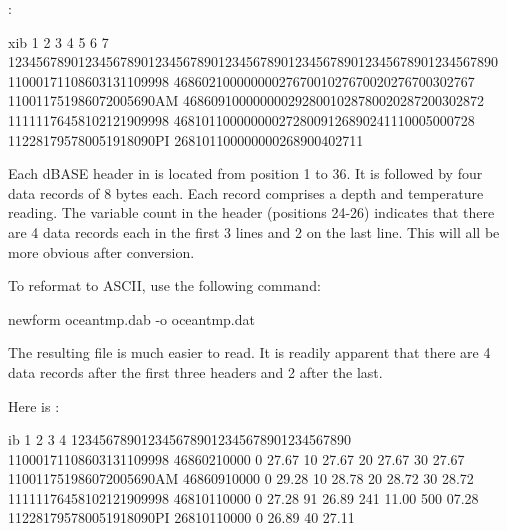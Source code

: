 :

\begin{vcode}{xib}
         1         2         3         4         5         6         7
1234567890123456789012345678901234567890123456789012345678901234567890
11000171108603131109998  4686021000000002767001027670020276700302767
110011751986072005690AM  4686091000000002928001028780020287200302872
11111176458102121909998  4681011000000002728009126890241110005000728
112281795780051918090PI  268101100000000268900402711 
\end{vcode}

Each dBASE header in  is located from position 1 to
36. It is followed by four data records of 8 bytes each. Each record
comprises a depth and temperature reading. The variable count in the
header (positions 24-26) indicates that there are 4 data records each
in the first 3 lines and 2 on the last line. This will all be more
obvious after conversion.

To reformat  to ASCII, use the following command: 

\begin{example}
newform oceantmp.dab -o oceantmp.dat 
\end{example}

The resulting file  is much easier to read. It is
readily apparent that there are 4 data records after the first three
headers and 2 after the last.

Here is :

\begin{vcode}{ib}
         1         2         3         4
1234567890123456789012345678901234567890
11000171108603131109998  46860210000
    0                     27.67
   10                     27.67
   20                     27.67
   30                     27.67
110011751986072005690AM  46860910000
    0                     29.28
   10                     28.78
   20                     28.72
   30                     28.72
11111176458102121909998  46810110000
    0                     27.28
   91                     26.89
  241                     11.00
  500                     07.28
112281795780051918090PI  26810110000
    0                     26.89
   40                     27.11
\end{vcode}





